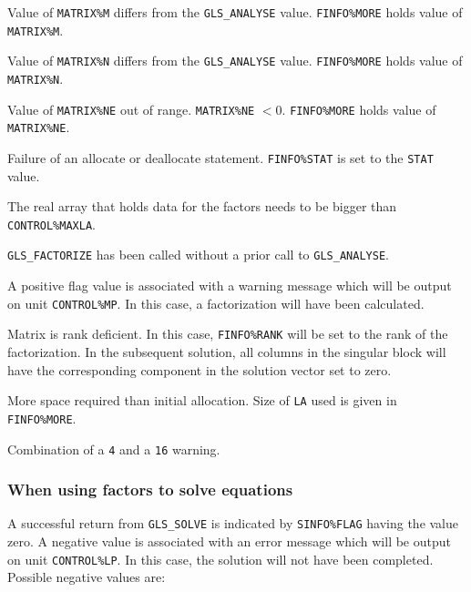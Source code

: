 \documentclass{galahad}
\newcommand{\packagename}{GLS}
\begin{document}
\begin{description}

  Value of {\tt MATRIX\%M} differs from the {\tt \packagename\_ANALYSE}
value. {\tt FINFO\%MORE} holds value of {\tt MATRIX\%M}.

  Value of {\tt MATRIX\%N} differs from the {\tt \packagename\_ANALYSE}
value. {\tt FINFO\%MORE} holds value of {\tt MATRIX\%N}.

  Value of {\tt MATRIX\%NE} out of range.  {\tt MATRIX\%NE} $<0$.
{\tt FINFO\%MORE} holds value of {\tt MATRIX\%NE}.

  Failure of an allocate or deallocate statement. {\tt FINFO\%STAT}
is set to the {\tt STAT} value.

 The real array that holds data for the factors
  needs to be bigger than {\tt CONTROL\%MAXLA}.

 {\tt \packagename\_FACTORIZE} has been called without a prior call to
 {\tt \packagename\_ANALYSE}.

\end{description}

\noindent
A positive flag value is associated with a warning message
which will  be output on unit {\tt CONTROL\%MP}. In this case,
a factorization will have been calculated.

\begin{description}

  Matrix is rank deficient.  In this case, {\tt FINFO\%RANK} will be
set to the rank of the factorization.  In the subsequent solution,
all columns in the singular block will have the corresponding component in
the solution vector set to zero.

 More space required than initial allocation.  Size of {\tt LA} used
 is given in {\tt FINFO\%MORE}.

 Combination of a {\tt 4} and a {\tt 16} warning.

\end{description}

\subsubsection{When using factors to solve equations} \label{errors}

A successful return from {\tt \packagename\_SOLVE} is indicated by
{\tt SINFO\%FLAG} having the value zero.  A negative value is
associated with an error message which will  be output on unit
{\tt CONTROL\%LP}. In this case, the solution will not have been completed.
Possible negative values are:
\end{document}
